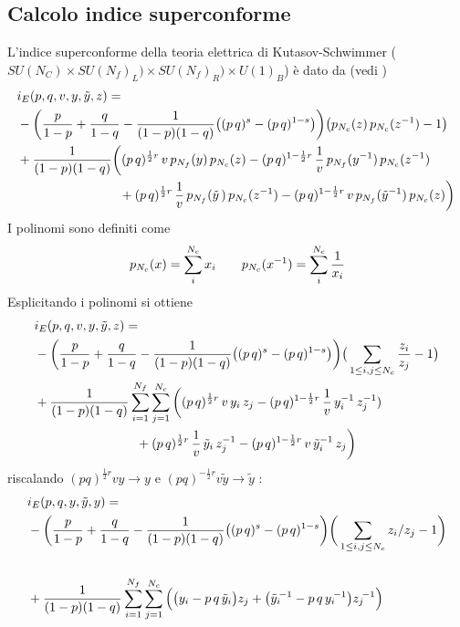 \documentclass[a4paper,12pt]{article}
\begin{document}
\subsection{Calcolo indice superconforme}
 L'indice superconforme della teoria elettrica di Kutasov-Schwimmer ( $ SU(N_C)  \times SU(N_f)_L)\times SU(N_f)_R)\times  U(1)_B  $) è dato da (vedi \citep{Dolan:2008qi})
 \begin{equation}
\begin{aligned}
& i_E (p,q,v, y,\tilde y ,z) = \\ & -\bigg({p \over 1-p}+{q \over 1-q} -{1 \over (1-p)(1-q)}
\big((p\,q)^{s}- (p\,q)^{1-s}\big)
\bigg) \big( p_{N_c}( z)\, p_{N_c}(z^{-1})-1\big ) \\ 
&{} +{1\over (1-p)(1-q)}\bigg((p\,q)^{{1\over 2}r} \, v \, p_{N_f}(y)\, p_{N_c}(z)
- (p\,q)^{1- {1\over 2}r} \, {1 \over v}\, p_{{N_f}}(y^{-1})\, p_{{N_c}}(z^{-1})\\
&\qquad\qquad\qquad\qquad
+ (p\,q)^{{1\over 2}r}\, {1\over v}\, p_{{N_f}}({\tilde y}\,) \, p_{{N_c}}(z^{-1})
- (p\,q)^{1- {1\over 2}r} \, v\, p_{N_f}({\tilde y}^{-1})\, p_{N_c}(z)\bigg) \,\\
\end{aligned}
\end{equation}
I polinomi sono definiti come
$$
 p_{N_c}({x}) = \sum_i^{N_c} x_i \qquad p_{N_c}({x^{-1}}) =  \sum_i^{N_c} { 1 \over x_i  }
$$
Esplicitando i polinomi si ottiene 
\begin{align*}
& i_E (p,q,v, y,\tilde y ,z) = \\ & -\bigg({p \over 1-p}+{q \over 1-q} -{1 \over (1-p)(1-q)}
\big((p\,q)^{s}- (p\,q)^{1-s}\big)
\bigg) \big(\sum_{1 \leq i,j \leq N_c} {z_i \over z_j} -1\big ) \\ 
&{} +{1\over (1-p)(1-q)}\sum_{i = 1}^{N_f} \sum_{j = 1}^{N_c}\bigg( (p\,q)^{{1\over 2}r} \, v \, y_i \, z_j
- (p\,q)^{1- {1\over 2}r} \, {1 \over v}\,y_i^{-1} \, z_j^{-1})\\
&\qquad\qquad\qquad\qquad
+ (p\,q)^{{1\over 2}r}\, {1\over v}\, \tilde y_i \, z_j^{-1}
- (p\,q)^{1- {1\over 2}r} \, v\, \tilde y_i^{-1}\, z_j\bigg) \,\\
\end{align*}
riscalando $ (pq)^{ \frac{1}{2} r }v y \rightarrow y$ e  
$ (pq)^{- \frac{1}{2} r } v \tilde y \rightarrow \tilde y$  :
\begin{equation}
\begin{aligned}
&i_E(p,q,y,{\tilde y},y) =\\ 
&{} -\bigg({p\over 1-p}+{q\over 1-q } -{1 \over (1-p)(1-q)}
\big((p\,q)^{s}- (p\,q)^{1-s}\bigg)
\bigg(\sum_{1\leq i,j\leq N_c}z_i/z_j-1\bigg)\cr\\ 
&{}+{1\over
(1-p)(1-q)}\sum_{i=1}^{N_f}\sum_{j=1}^{N_c}\Big(\big (y_i-p\,q\,{\tilde y}_i \big )z_j
+ \big ({\tilde y}_i{\!}^{-1}-p\,q\,y_i{\!}^{-1} \big )z_j{\!}^{-1}\Big)\, 
\end{aligned}
\end{equation}
\end{document}
